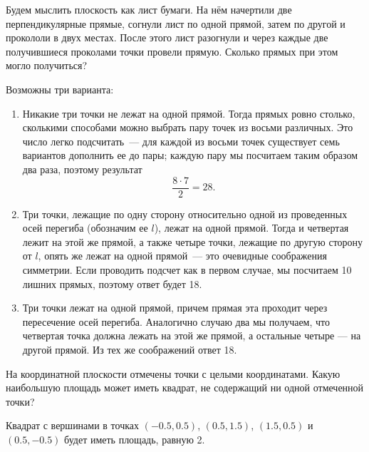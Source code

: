 

\begin{itemize}

\itB Будем мыслить плоскость как лист бумаги. На нём начертили две перпендикулярные прямые, 
согнули лист по одной прямой, затем по другой и прокололи в двух местах. После этого лист 
разогнули и через каждые две получившиеся проколами точки провели прямую. Сколько прямых при 
этом могло получиться?

\itr Возможны три варианта:

\begin{enumerate}
\item Никакие три точки не лежат на одной прямой. Тогда прямых ровно столько, сколькими 
способами можно выбрать пару точек из восьми различных. Это число легко подсчитать~--- 
для каждой из восьми точек существует семь вариантов дополнить ее до пары; каждую пару 
мы посчитаем таким образом два раза, поэтому результат
$$
\frac{8\cdot 7}{2}=28.
$$

\item Три точки, лежащие по одну сторону относительно одной из проведенных осей перегиба 
(обозначим ее $l$), лежат на одной прямой. Тогда и четвертая лежит на этой же прямой, 
а также четыре точки, лежащие по другую сторону от $l$, опять же лежат на одной прямой~--- 
это очевидные соображения симметрии. Если проводить подсчет как в первом случае, мы 
посчитаем 10 лишних прямых, поэтому ответ будет 18.

\item Три точки лежат на одной прямой, причем прямая эта проходит через пересечение осей 
перегиба. Аналогично случаю два мы получаем, что четвертая точка должна лежать на этой же 
прямой, а остальные четыре --- на другой прямой. Из тех же соображений ответ 18.
\end{enumerate}

\itC На координатной плоскости отмечены точки с целыми координатами. Какую 
наибольшую площадь может иметь квадрат, не содержащий ни одной отмеченной точки?

\itr Квадрат с вершинами в точках $(-0.5,0.5)$, $(0.5,1.5)$, $(1.5,0.5)$ и $(0.5,-0.5)$ 
будет иметь площадь, равную 2.

\begin{center}\end{center}


\end{itemize}
